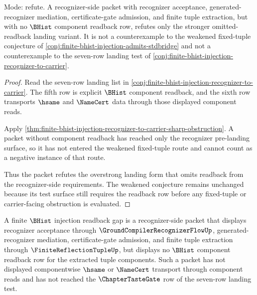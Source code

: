 \begin{theorem}
\label{thm:finite-bhist-injection-readback-refutation}
Mode: refute. A recognizer-side packet with recognizer acceptance, generated-recognizer mediation, certificate-gate admission, and finite tuple extraction, but with no $\BHist$ component readback row, refutes only the stronger omitted-readback landing variant. It is not a counterexample to the weakened fixed-tuple conjecture of \autoref{conj:finite-bhist-injection-admits-stdbridge} and not a counterexample to the seven-row landing test of \autoref{conj:finite-bhist-injection-recognizer-to-carrier}.
\end{theorem}
\begin{proof}
Read the seven-row landing list in \autoref{conj:finite-bhist-injection-recognizer-to-carrier}. The fifth row is explicit $\BHist$ component readback, and the sixth row transports $\hsame$ and $\NameCert$ data through those displayed component reads.

Apply \autoref{thm:finite-bhist-injection-recognizer-to-carrier-sharp-obstruction}. A packet without component readback has reached only the recognizer pre-landing surface, so it has not entered the weakened fixed-tuple route and cannot count as a negative instance of that route.

Thus the packet refutes the overstrong landing form that omits readback from the recognizer-side requirements. The weakened conjecture remains unchanged because its test surface still requires the readback row before any fixed-tuple or carrier-facing obstruction is evaluated.
\end{proof}

\begin{definition}
\label{def:finite-bhist-injection-readback-gap}
A finite $\BHist$ injection readback gap is a recognizer-side packet that displays recognizer acceptance through $\GroundCompilerRecognizerFlowUp$, generated-recognizer mediation, certificate-gate admission, and finite tuple extraction through $\FiniteReflectionTupleUp$, but displays no $\BHist$ component readback row for the extracted tuple components. Such a packet has not displayed componentwise $\hsame$ or $\NameCert$ transport through component reads and has not reached the $\ChapterTasteGate$ row of the seven-row landing test.
\end{definition}

